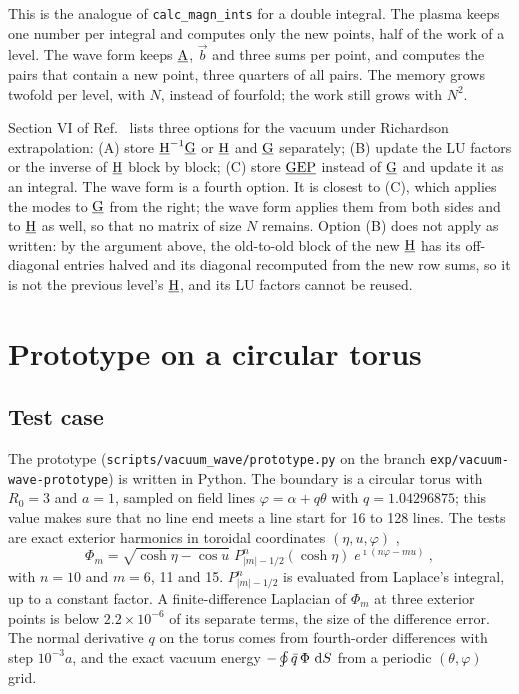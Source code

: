 \documentclass[%
 aip,
 rsi,%
 amsmath,amssymb,
 reprint,%
]{revtex4-1}
\begin{document}
This is the analogue of \texttt{calc\_magn\_ints} for a double integral.
The plasma keeps one number per integral and computes only the new points, half of the work of a level.
The wave form keeps $\underline{\mathrm{A}}$, $\vec{b}$ and three sums per point, and computes the pairs that contain a new point, three quarters of all pairs.
The memory grows twofold per level, with $N$, instead of fourfold; the work still grows with $N^2$.

Section VI of Ref.~ lists three options for the vacuum under Richardson extrapolation: (A) store $\underline{\mathrm{H}}^{-1}\underline{\mathrm{G}}$ or $\underline{\mathrm{H}}$ and $\underline{\mathrm{G}}$ separately; (B) update the LU factors or the inverse of $\underline{\mathrm{H}}$ block by block; (C) store $\underline{\mathrm{G}}\underline{\mathrm{E}}\underline{\mathrm{P}}$ instead of $\underline{\mathrm{G}}$ and update it as an integral.
The wave form is a fourth option.
It is closest to (C), which applies the modes to $\underline{\mathrm{G}}$ from the right; the wave form applies them from both sides and to $\underline{\mathrm{H}}$ as well, so that no matrix of size $N$ remains.
Option (B) does not apply as written: by the argument above, the old-to-old block of the new $\underline{\mathrm{H}}$ has its off-diagonal entries halved and its diagonal recomputed from the new row sums, so it is not the previous level's $\underline{\mathrm{H}}$, and its LU factors cannot be reused.

\section{Prototype on a circular torus}\label{sec:prototype}
\subsection{Test case}
The prototype (\texttt{scripts/vacuum\_wave/prototype.py} on the branch \texttt{exp/vacuum-wave-prototype}) is written in Python.
The boundary is a circular torus with $R_0 = 3$ and $a = 1$, sampled on field lines $\varphi = \alpha + q\theta$ with $q = 1.04296875$; this value makes sure that no line end meets a line start for 16 to 128 lines.
The tests are exact exterior harmonics in toroidal coordinates $(\eta, u, \varphi)$ \cite{DLMF14},
\begin{equation}
\Phi_m = \sqrt{\cosh\eta - \cos u}\;P^{n}_{|m|-1/2}(\cosh\eta)\;e^{\imath(n\varphi - m u)} \ ,
\end{equation}
with $n = 10$ and $m = 6$, 11 and 15.
$P^n_{|m|-1/2}$ is evaluated from Laplace's integral, up to a constant factor.
A finite-difference Laplacian of $\Phi_m$ at three exterior points is below $2.2\times10^{-6}$ of its separate terms, the size of the difference error.
The normal derivative $q$ on the torus comes from fourth-order differences with step $10^{-3}a$, and the exact vacuum energy $-\oint\bar{q}\,\Phi\,\operatorname{d}\!{S}$ from a periodic $(\theta,\varphi)$ grid.
\end{document}
